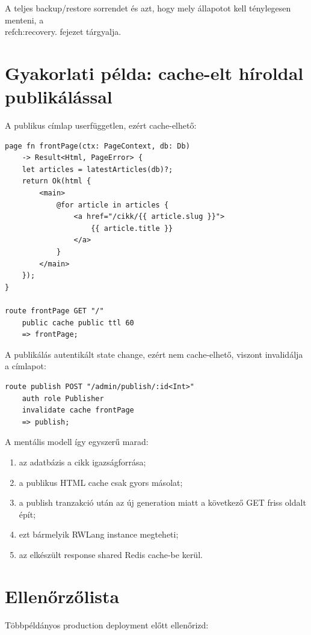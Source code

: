 A teljes backup/restore sorrendet és azt, hogy mely állapotot kell ténylegesen menteni, a \\ref{ch:recovery}. fejezet tárgyalja.

\section{Gyakorlati példa: cache-elt híroldal publikálással}

A publikus címlap userfüggetlen, ezért cache-elhető:

\begin{lstlisting}[language=RWLang]
page fn frontPage(ctx: PageContext, db: Db)
    -> Result<Html, PageError> {
    let articles = latestArticles(db)?;
    return Ok(html {
        <main>
            @for article in articles {
                <a href="/cikk/{{ article.slug }}">
                    {{ article.title }}
                </a>
            }
        </main>
    });
}

route frontPage GET "/"
    public cache public ttl 60
    => frontPage;
\end{lstlisting}

A publikálás autentikált state change, ezért nem cache-elhető, viszont invalidálja a címlapot:

\begin{lstlisting}[language=RWLang]
route publish POST "/admin/publish/:id<Int>"
    auth role Publisher
    invalidate cache frontPage
    => publish;
\end{lstlisting}

A mentális modell így egyszerű marad:

\begin{enumerate}
  \item az adatbázis a cikk igazságforrása;
  \item a publikus HTML cache csak gyors másolat;
  \item a publish tranzakció után az új generation miatt a következő GET friss oldalt épít;
  \item ezt bármelyik RWLang instance megteheti;
  \item az elkészült response shared Redis cache-be kerül.
\end{enumerate}

\section{Ellenőrzőlista}

Többpéldányos production deployment előtt ellenőrizd:

